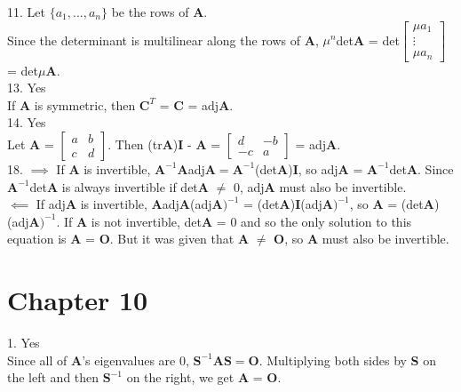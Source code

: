 \documentclass{article}
\begin{document}
    11. Let $\{\textit{a}_1, ..., \textit{a}_n\}$ be the rows of \textbf{A}. \\
    Since the determinant is multilinear along the rows of \textbf{A}, $\mu^{n}$det\textbf{A} = det$\begin{bmatrix} \mu\textit{a}_1\\ \vdots \\ \mu\textit{a}_n\end{bmatrix}$ = det$\mu$\textbf{A}.\\

    13. Yes \\
    If \textbf{A} is symmetric, then $\textbf{C}^T$ = \textbf{C} = adj\textbf{A}.\\

    14. Yes\\
    Let \textbf{A} = $\begin{bmatrix}a&b\\c&d\end{bmatrix}$. Then (tr\textbf{A})\textbf{I} - \textbf{A} = $\begin{bmatrix}d&-b\\-c&a\end{bmatrix}$ = adj\textbf{A}.\\

    18. $\implies$ If \textbf{A} is invertible, $\textbf{A}^{-1}\textbf{A}$adj$\textbf{A} = \textbf{A}^{-1}$(det\textbf{A})\textbf{I}, so adj\textbf{A} = $\textbf{A}^{-1}$det\textbf{A}. Since $\textbf{A}^{-1}$det\textbf{A} is always invertible if det\textbf{A} $\neq$ 0, adj\textbf{A} must also be invertible.\\
  $\impliedby$ If adj\textbf{A} is invertible, \textbf{A}adj\textbf{A}(adj$\textbf{A})^{-1}$ = (det\textbf{A})\textbf{I}(adj$\textbf{A})^{-1}$, so \textbf{A} = (det\textbf{A})(adj$\textbf{A})^{-1}$. If \textbf{A} is not invertible, det\textbf{A} = 0 and so the only solution to this equation is \textbf{A} = \textbf{O}. But it was given that \textbf{A} $\neq$ \textbf{O}, so \textbf{A} must also be invertible.
    \section*{Chapter 10}
    \setlength{\parindent}{0pt}
    1. Yes\\
    Since all of \textbf{A}'s eigenvalues are 0, $\textbf{S}^{-1}\textbf{AS} = \textbf{O}$. Multiplying both sides by \textbf{S} on the left and then $\textbf{S}^{-1}$ on the right, we get \textbf{A} = \textbf{O}.\\
\end{document}
